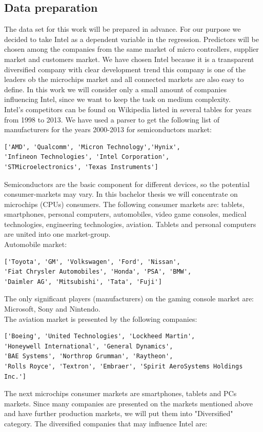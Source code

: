 \documentclass [twoside,
  11pt, a4paper,
  footinclude=true,
  headinclude=true,
  cleardoublepage=empty
]{article}
\begin{document}
\subsection{Data preparation}
The data set for this work will be prepared in advance. For our purpose we decided to take Intel as a dependent variable in the regression. Predictors will be chosen among the companies from the same market of micro controllers, supplier market and customers market. We have chosen Intel because it is a transparent diversified company with clear development trend this company is one of the leaders ob the microchips market and all connected markets are also easy to define. In this work we will consider only a small amount of companies influencing Intel, since we want to keep the task on medium complexity.\\
Intel's competitors can be found on Wikipedia listed in several tables for years from 1998 to 2013. We have used a parser to get the following list of manufacturers for the years 2000-2013 for semiconductors market:
\begin{verbatim}
['AMD', 'Qualcomm', 'Micron Technology','Hynix',
'Infineon Technologies', 'Intel Corporation', 
'STMicroelectronics', 'Texas Instruments']
\end{verbatim}
Semiconductors are the basic component for different devices, so the potential consumer-markets may vary. In this bachelor thesis we will concentrate on microchips (CPUs) consumers. The following consumer markets are: tablets, smartphones, personal computers, automobiles, video game consoles, medical technologies, engineering technologies, aviation. Tablets and personal computers are united into one market-group.\\
Automobile market:
\begin{verbatim}
['Toyota', 'GM', 'Volkswagen', 'Ford', 'Nissan', 
'Fiat Chrysler Automobiles', 'Honda', 'PSA', 'BMW',
'Daimler AG', 'Mitsubishi', 'Tata', 'Fuji']
\end{verbatim}
The only significant players (manufacturers) on the gaming console market are: Microsoft, Sony and Nintendo.\\ 
The aviation market is presented by the following companies: 
\begin{verbatim}
['Boeing', 'United Technologies', 'Lockheed Martin',
'Honeywell International', 'General Dynamics',
'BAE Systems', 'Northrop Grumman', 'Raytheon',
'Rolls Royce', 'Textron', 'Embraer', 'Spirit AeroSystems Holdings Inc.']
\end{verbatim}
The next microchips consumer markets are smartphones, tablets and PCs markets. Since many companies are presented on the markets mentioned above and have further production markets, we will put them into "Diversified" category. The diversified companies that may influence Intel are:
\end{document}
